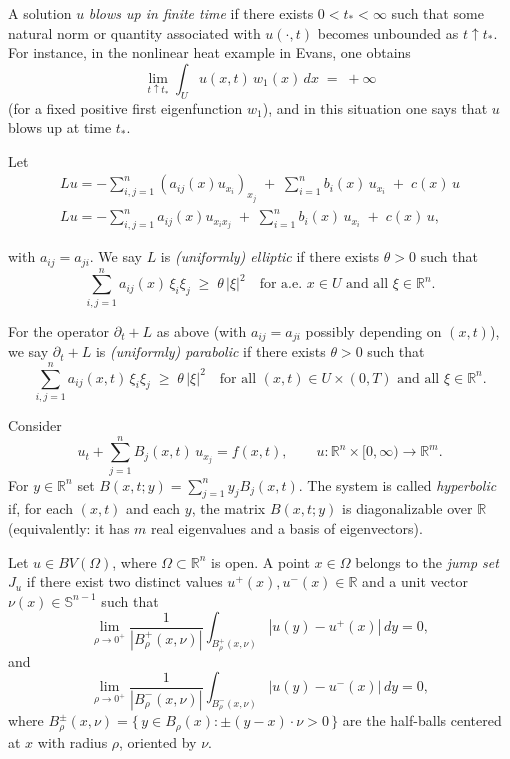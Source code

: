 \begin{appendices}
\begin{definition}[Blow-up]
A solution $u$ \emph{blows up in finite time} if there exists $0<t_*<\infty$ such that some natural norm or quantity associated with $u(\cdot,t)$ becomes unbounded as $t\uparrow t_*$. For instance, in the nonlinear heat example in Evans, one obtains 
\[
\lim_{t\uparrow t_*} \int_U u(x,t)\,w_1(x)\,dx \;=\; +\infty
\]
(for a fixed positive first eigenfunction $w_1$), and in this situation one says that $u$ blows up at time $t_*$.
\end{definition}

\begin{definition}
Let
\begin{align*}
Lu = -\sum_{i,j=1}^n (a_{ij}(x) u_{x_i})_{x_j} \;+\; \sum_{i=1}^n b_i(x)\,u_{x_i} \;+\; c(x)\,u
\\
Lu = -\sum_{i,j=1}^n a_{ij}(x) u_{x_i x_j} \;+\; \sum_{i=1}^n b_i(x)\,u_{x_i} \;+\; c(x)\,u,
\end{align*}

with $a_{ij}=a_{ji}$. We say $L$ is \emph{(uniformly) elliptic} if there exists $\theta>0$ such that
\[
\sum_{i,j=1}^n a_{ij}(x)\,\xi_i\xi_j \;\ge\; \theta\,|\xi|^2
\quad\text{for a.e. }x\in U\text{ and all }\xi\in\mathbb{R}^n.
\]
\end{definition}

\begin{definition}
For the operator $\partial_t+L$ as above (with $a_{ij}=a_{ji}$ possibly depending on $(x,t)$), we say $\partial_t+L$ is \emph{(uniformly) parabolic} if there exists $\theta>0$ such that
\[
\sum_{i,j=1}^n a_{ij}(x,t)\,\xi_i\xi_j \;\ge\; \theta\,|\xi|^2
\quad\text{for all }(x,t)\in U\times(0,T)\text{ and all }\xi\in\mathbb{R}^n.
\]
\end{definition}

\begin{definition}
Consider
\[
u_t + \sum_{j=1}^n B_j(x,t)\,u_{x_j} = f(x,t),\qquad
u:\mathbb{R}^n\times[0,\infty)\to\mathbb{R}^m.
\]
For $y\in\mathbb{R}^n$ set $B(x,t;y)=\sum_{j=1}^n y_j B_j(x,t)$. The system is called \emph{hyperbolic} if,
for each $(x,t)$ and each $y$, the matrix $B(x,t;y)$ is diagonalizable over $\mathbb{R}$ (equivalently:
it has $m$ real eigenvalues and a basis of eigenvectors).
\end{definition}


\begin{definition}
Let $u \in BV(\Omega)$, where $\Omega \subset \mathbb{R}^n$ is open.  
A point $x \in \Omega$ belongs to the \emph{jump set} $J_u$ if there exist two distinct values $u^+(x), u^-(x) \in \mathbb{R}$ and a unit vector $\nu(x) \in \mathbb{S}^{n-1}$ such that
\[
\lim_{\rho \to 0^+} \frac{1}{|B_\rho^+(x,\nu)|}
  \int_{B_\rho^+(x,\nu)} |u(y) - u^+(x)| \, dy = 0,
\]
and
\[
\lim_{\rho \to 0^+} \frac{1}{|B_\rho^-(x,\nu)|}
  \int_{B_\rho^-(x,\nu)} |u(y) - u^-(x)| \, dy = 0,
\]
where $B_\rho^\pm(x,\nu) = \{\, y \in B_\rho(x) : \pm (y-x)\cdot \nu > 0 \,\}$ are the half-balls centered at $x$ with radius $\rho$, oriented by $\nu$.
  

\end{definition}
\end{appendices}
